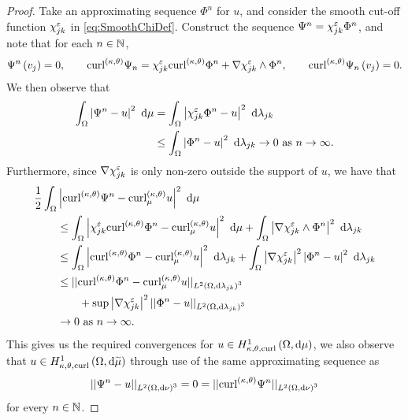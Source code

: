 \begin{proof}
	Take an approximating sequence $\Phi^n$ for $u$, and consider the smooth cut-off function $\chi_{jk}^{\varepsilon}$ in \eqref{eq:SmoothChiDef}.
	Construct the sequence $\Psi^n = \chi_{jk}^{\varepsilon}\Phi^n$, and note that for each $n\in\mathbb{N}$, 
	\begin{align*}
		\Psi^n\left( v_j \right)=0, \qquad
		\mathrm{curl}_{}^{\left( \kappa, \theta \right)}\Psi_n = \chi_{jk}^{\varepsilon}\mathrm{curl}_{}^{\left( \kappa, \theta \right)}\Phi^n + \nabla\chi_{jk}^{\varepsilon}\wedge\Phi^n, \qquad
		\mathrm{curl}_{}^{\left( \kappa, \theta \right)}\Psi_n\left( v_j \right) = 0.
	\end{align*}
	We then observe that
	\begin{align*}
		\int_{\Omega} \left\lvert \Psi^n-u \right\rvert^2  \ \mathrm{d}\mu
		&= \int_{\Omega} \left\lvert \chi_{jk}^\varepsilon\Phi^n-u \right\rvert^2  \ \mathrm{d}\lambda_{jk} \\
		&\leq \int_{\Omega} \left\lvert \Phi^n-u \right\rvert^2  \ \mathrm{d}\lambda_{jk} \rightarrow 0 \ \text{as} \ n \rightarrow\infty.
	\end{align*}
	Furthermore, since $\nabla\chi_{jk}^\varepsilon$ is only non-zero outside the support of $u$, we have that
	\begin{align*}
		\recip{2}\integral{\ddom}{ & \abs{\ktcurl{}\Psi^n - \ktcurl{\ddmes}u}^2 }{\ddmes} \\
		&\leq \integral{\ddom}{ \abs{\chi_{jk}^{\eps}\ktcurl{}\Phi^n - \ktcurl{\ddmes}u}^2 }{\ddmes}
		+ \integral{\ddom}{ \abs{\grad\chi_{jk}^{\eps}\wedge\Phi^n}^2 }{\lambda_{jk}} \\
		&\leq \integral{\ddom}{ \abs{\ktcurl{}\Phi^n - \ktcurl{\ddmes}u}^2 }{\lambda_{jk}} %
		+ \integral{\ddom}{ \abs{\grad\chi_{jk}^\eps}^2\abs{\Phi^n - u}^2 }{\lambda_{jk}} \\
		&\leq \norm{\ktcurl{}\Phi^n - \ktcurl{\ddmes}u}_{\ltwo{\ddom}{\lambda_{jk}}^3} \\
		&\qquad + \sup\abs{\grad\chi_{jk}^\eps}^2\norm{\Phi^n - u}_{\ltwo{\ddom}{\lambda_{jk}}^3} \\
		&\rightarrow0 \toInfty{n}.
	\end{align*}
	This gives us the required convergences for $u\in H^1_{\kappa,\theta,\mathrm{curl}}\left( \Omega, \mathrm{d}\mu \right)$, we also observe that $u\in H^1_{\kappa,\theta,\mathrm{curl}}\left( \Omega, \mathrm{d}\widetilde{\mu} \right)$ through use of the same approximating sequence as
	\begin{align*}
		\lvert\lvert \Psi^n-u \rvert\rvert_{L^{2}\left( \Omega,\mathrm{d} \nu \right)^3} = 0 = \lvert\lvert \mathrm{curl}_{}^{\left( \kappa, \theta \right)}\Psi^n \rvert\rvert_{L^{2}\left( \Omega,\mathrm{d} \nu \right)^3}
	\end{align*}
	for every $n\in\mathbb{N}$.
\end{proof}

